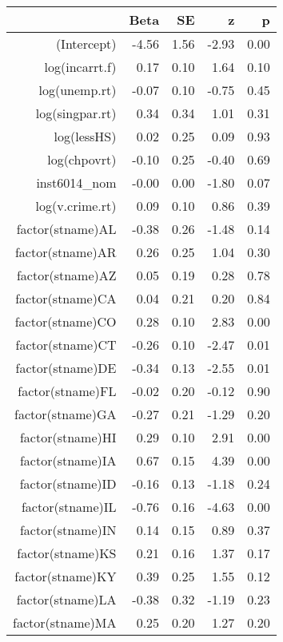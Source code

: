 \begin{table}[ht]
\centering
\begin{tabular}{rrrrr}
  \hline
 & Beta & SE & z & p \\ 
  \hline
(Intercept) & -4.56 & 1.56 & -2.93 & 0.00 \\ 
  log(incarrt.f) & 0.17 & 0.10 & 1.64 & 0.10 \\ 
  log(unemp.rt) & -0.07 & 0.10 & -0.75 & 0.45 \\ 
  log(singpar.rt) & 0.34 & 0.34 & 1.01 & 0.31 \\ 
  log(lessHS) & 0.02 & 0.25 & 0.09 & 0.93 \\ 
  log(chpovrt) & -0.10 & 0.25 & -0.40 & 0.69 \\ 
  inst6014\_nom & -0.00 & 0.00 & -1.80 & 0.07 \\ 
  log(v.crime.rt) & 0.09 & 0.10 & 0.86 & 0.39 \\ 
  factor(stname)AL & -0.38 & 0.26 & -1.48 & 0.14 \\ 
  factor(stname)AR & 0.26 & 0.25 & 1.04 & 0.30 \\ 
  factor(stname)AZ & 0.05 & 0.19 & 0.28 & 0.78 \\ 
  factor(stname)CA & 0.04 & 0.21 & 0.20 & 0.84 \\ 
  factor(stname)CO & 0.28 & 0.10 & 2.83 & 0.00 \\ 
  factor(stname)CT & -0.26 & 0.10 & -2.47 & 0.01 \\ 
  factor(stname)DE & -0.34 & 0.13 & -2.55 & 0.01 \\ 
  factor(stname)FL & -0.02 & 0.20 & -0.12 & 0.90 \\ 
  factor(stname)GA & -0.27 & 0.21 & -1.29 & 0.20 \\ 
  factor(stname)HI & 0.29 & 0.10 & 2.91 & 0.00 \\ 
  factor(stname)IA & 0.67 & 0.15 & 4.39 & 0.00 \\ 
  factor(stname)ID & -0.16 & 0.13 & -1.18 & 0.24 \\ 
  factor(stname)IL & -0.76 & 0.16 & -4.63 & 0.00 \\ 
  factor(stname)IN & 0.14 & 0.15 & 0.89 & 0.37 \\ 
  factor(stname)KS & 0.21 & 0.16 & 1.37 & 0.17 \\ 
  factor(stname)KY & 0.39 & 0.25 & 1.55 & 0.12 \\ 
  factor(stname)LA & -0.38 & 0.32 & -1.19 & 0.23 \\ 
  factor(stname)MA & 0.25 & 0.20 & 1.27 & 0.20 \\ 

\end{tabular}
\end{table}
